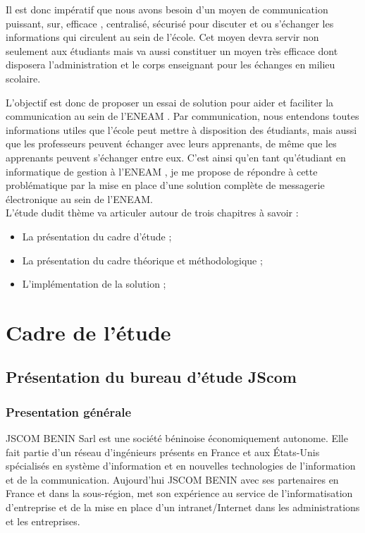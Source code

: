 \documentclass[a4paper,12pt,french]{report} %
\begin{document}
	 Il est donc impératif que nous avons besoin d'un moyen de communication puissant, sur, efficace , centralisé, sécurisé pour discuter et ou s'échanger les informations qui circulent au sein de l'école. Cet moyen devra servir non seulement aux étudiants mais va aussi constituer un moyen très efficace dont disposera l'administration et le corps enseignant pour les échanges en milieu scolaire. 

	L'objectif est donc de proposer un essai de solution pour aider et faciliter la communication au sein de l'ENEAM \label{ref:eneam}. Par communication, nous entendons toutes informations utiles que l'école peut mettre à disposition des étudiants, mais aussi que les professeurs peuvent échanger avec leurs apprenants, de même que les apprenants peuvent s'échanger entre eux. C'est ainsi qu'en tant qu'étudiant en informatique de gestion à l'ENEAM \label{ref:eneam}, je me propose de répondre à cette problématique par la mise en place d'une solution complète de messagerie électronique au sein de l'ENEAM\label{ref:eneam}. \\

L'étude dudit thème va articuler autour de trois chapitres à savoir :
\begin{itemize}
	\item La présentation du cadre d'étude ;
	\item La présentation du cadre théorique et méthodologique ;
	\item L'implémentation de la solution ;
\end{itemize}

\chapter{Cadre de l'étude}

\section{Présentation du bureau d'étude JScom}
	\subsection{Presentation générale}
	JSCOM BENIN Sarl est une société béninoise économiquement autonome. Elle fait partie d'un réseau d'ingénieurs présents en France et aux États-Unis spécialisés en système d'information et en nouvelles technologies de l'information et de la communication. Aujourd'hui JSCOM BENIN avec ses partenaires en France et dans la sous-région, met son expérience au service de l'informatisation d'entreprise et de la mise en place d'un intranet/Internet dans les administrations et les entreprises.
\end{document}
